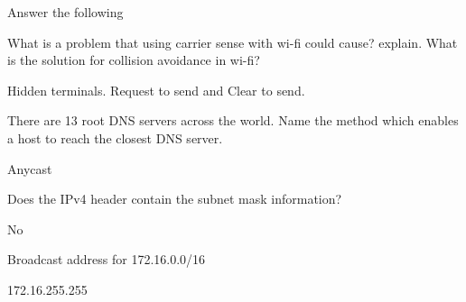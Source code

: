 \documentclass[answers,addpoints]{exam}
\begin{document}
\newpage
\begin{questions}


\question 
Answer the following


\question 
What is a problem that using carrier sense with wi-fi could cause? explain. What is the solution for collision avoidance in wi-fi?
\fillwithdottedlines{1in}
\begin{solution} Hidden terminals. Request to send and Clear to send. \end{solution} 



\question 
There are 13 root DNS servers across the world. Name the method which enables a host to reach the closest DNS server. 
\fillwithdottedlines{0.5in}

\begin{solution} 
Anycast
\end{solution} 


\question
Does the IPv4 header contain the subnet mask information?
\fillwithdottedlines{0.5in}

\begin{solution} 
No
\end{solution} 

\question
Broadcast address for 172.16.0.0/16
\fillwithdottedlines{0.5in}
\begin{solution} 
172.16.255.255
\end{solution} 


\end{questions}
\end{document}
